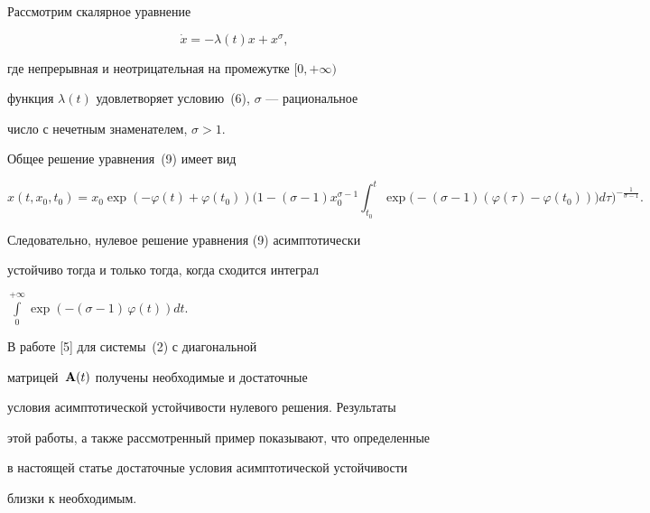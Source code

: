 \begin{exam}


Рассмотрим скалярное уравнение


\begin{equation}


\Dot x=-\lambda(t)  x+x^\sigma,


\end{equation}


где непрерывная и неотрицательная на промежутке $[0, +\infty)$


функция $\lambda(t)$ удовлетворяет условию~(6), $\sigma$ --- рациональное


число с нечетным знаменателем, $\sigma>1$.





Общее решение уравнения~(9) имеет вид


$$


x(t, x_0, t_0)=x_0 \exp \left(-\varphi(t)+\varphi(t_0)\right) \bigg(1-


(\sigma-1)


x_0^{\sigma-1} \int_{t_0}^{t} \exp \big(-(\sigma-1)(\varphi(\tau)-


\varphi(t_0))\big) d\tau \bigg)^{-\frac1{\sigma-1}}.


$$


Следовательно, нулевое решение уравнения (9) асимптотически


устойчиво тогда и только тогда, когда сходится интеграл


$\int\limits_0^{+\infty} \exp (-(\sigma-1) \, \varphi(t))dt$.


\end{exam}





\begin{note}


В работе [5] для системы~(2) с диагональной


матрицей~$\bold A(t)$ получены необходимые и достаточные 


условия асимптотической устойчивости нулевого решения. Результаты


этой работы, а также рассмотренный пример показывают, что определенные


в настоящей статье достаточные условия асимптотической устойчивости


близки к необходимым.


\end{note}





